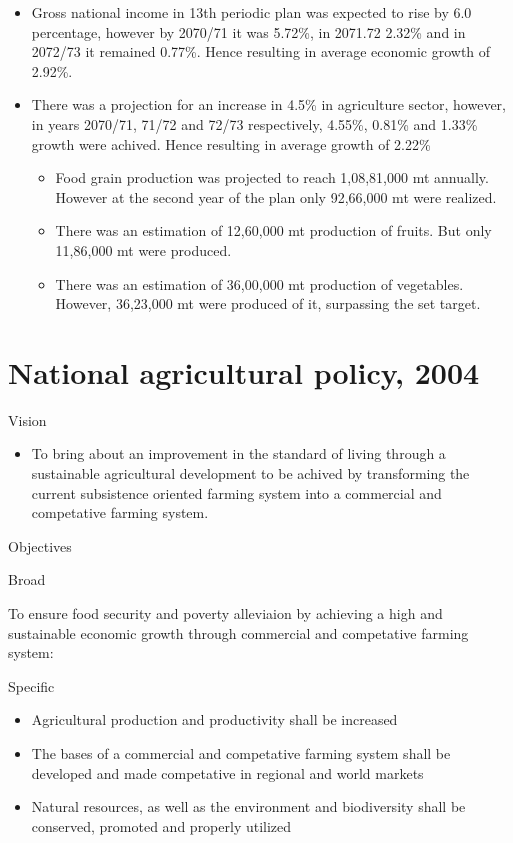 \documentclass[
]{book}
\providecommand{\tightlist}{%
  \setlength{\itemsep}{0pt}\setlength{\parskip}{0pt}}
\begin{document}
\begin{itemize}
\tightlist
\item
  Gross national income in 13th periodic plan was expected to rise by 6.0 percentage, however by 2070/71 it was 5.72\%, in 2071.72 2.32\% and in 2072/73 it remained 0.77\%. Hence resulting in average economic growth of 2.92\%.
\item
  There was a projection for an increase in 4.5\% in agriculture sector, however, in years 2070/71, 71/72 and 72/73 respectively, 4.55\%, 0.81\% and 1.33\% growth were achived. Hence resulting in average growth of 2.22\%

  \begin{itemize}
  \tightlist
  \item
    Food grain production was projected to reach 1,08,81,000 mt annually. However at the second year of the plan only 92,66,000 mt were realized.
  \item
    There was an estimation of 12,60,000 mt production of fruits. But only 11,86,000 mt were produced.
  \item
    There was an estimation of 36,00,000 mt production of vegetables. However, 36,23,000 mt were produced of it, surpassing the set target.
  \end{itemize}
\end{itemize}

\hypertarget{national-agricultural-policy-2004}{%
\section{National agricultural policy, 2004}\label{national-agricultural-policy-2004}}

Vision

\begin{itemize}
\tightlist
\item
  To bring about an improvement in the standard of living through a sustainable agricultural development to be achived by transforming the current subsistence oriented farming system into a commercial and competative farming system.
\end{itemize}

Objectives

Broad

To ensure food security and poverty alleviaion by achieving a high and sustainable economic growth through commercial and competative farming system:

Specific

\begin{itemize}
\tightlist
\item
  Agricultural production and productivity shall be increased
\item
  The bases of a commercial and competative farming system shall be developed and made competative in regional and world markets
\item
  Natural resources, as well as the environment and biodiversity shall be conserved, promoted and properly utilized
\end{itemize}
\end{document}
